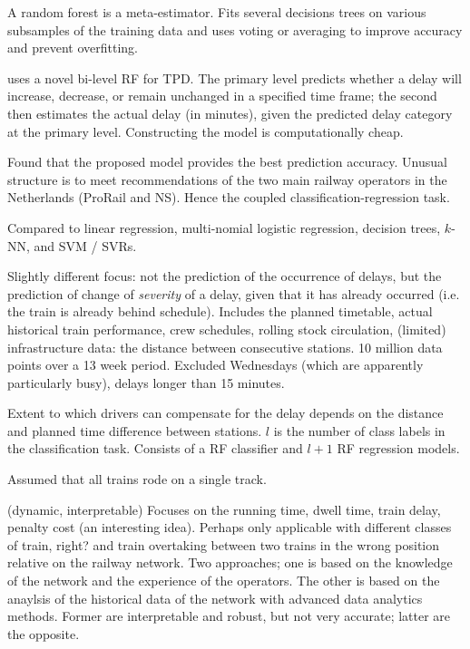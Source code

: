\documentclass{article}
\begin{document}
A random forest is a meta-estimator. Fits several decisions trees on various subsamples of the training data and uses voting or averaging to improve accuracy and prevent overfitting. 

\cite{nabian_et_al_2019} uses a novel bi-level RF for TPD. The primary level predicts whether a delay will increase, decrease, or remain unchanged in a specified time frame; the second then estimates the actual delay (in minutes), given the predicted delay category at the primary level. Constructing the model is computationally cheap. 

Found that the proposed model provides the best prediction accuracy. Unusual structure is to meet recommendations of the two main railway operators in the Netherlands (ProRail and NS). Hence the coupled classification-regression task. 

Compared to linear regression, multi-nomial logistic regression, decision trees, $k$-NN, and SVM / SVRs. 

Slightly different focus: not the prediction of the occurrence of delays, but the prediction of change of \textit{severity} of a delay, given that it has already occurred (i.e. the train is already behind schedule). Includes the planned timetable, actual historical train performance, crew schedules, rolling stock circulation, (limited) infrastructure data: the distance between consecutive stations.
10 million data points over a 13 week period. Excluded Wednesdays (which are apparently particularly busy), delays longer than 15 minutes.

Extent to which drivers can compensate for the delay depends on the distance and planned time difference between stations. 
$l$ is the number of class labels in the classification task. Consists of a RF classifier and $l + 1$ RF regression models.

Assumed that all trains rode on a single track.

\cite{oneto_et_al_2018} (dynamic, interpretable) Focuses on the running time, dwell time, train delay, penalty cost (an interesting idea). Perhaps only applicable with different classes of train, right? and train overtaking between two trains in the wrong position relative on the railway network. Two approaches; one is based on the knowledge of the network and the experience of the operators. The other is based on the anaylsis of the historical data of the network with advanced data analytics methods. Former are interpretable and robust, but not very accurate; latter are the opposite. 
\end{document}
